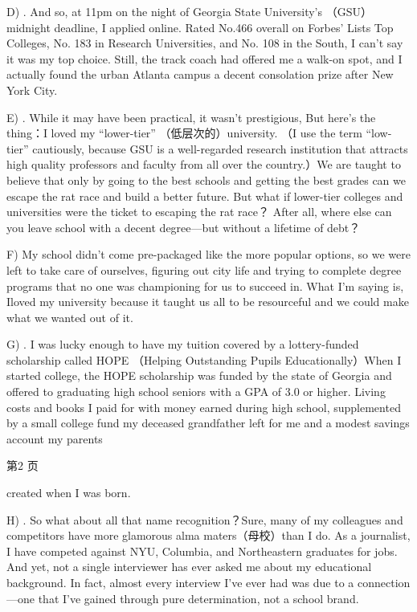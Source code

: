 \documentclass[UTF8,11pt]{ctexart}
\begin{document}
D) . And so, at 11pm on the night of Georgia State University’s （GSU）midnight deadline, I applied online. Rated No.466 overall on Forbes’ Lists Top Colleges, No. 183 in Research Universities, and No. 108 in the South, I can’t say it was my top choice. Still, the track coach had offered me a walk-on spot, and I actually found the urban Atlanta campus a decent consolation prize after New York City.


E) . While it may have been practical, it wasn’t prestigious, But here’s the thing：I loved my “lower-tier” （低层次的）university. （I use the term “low-tier” cautiously, because GSU is a well-regarded research institution that attracts high quality professors and faculty from all over the country.）We are taught to believe that only by going to the best schools and getting the best grades can we escape the rat race and build a better future. But what if lower-tier colleges and universities were the ticket to escaping the rat race？ After all, where else can you leave school with a decent degree—but without a lifetime of debt？


F) My school didn’t come pre-packaged like the more popular options, so we were left to take care of ourselves, figuring out city life and trying to complete degree programs that no one was championing for us to succeed in. What I’m saying is, Iloved my university because it taught us all to be resourceful and we could make what we wanted out of it.


G) . I was lucky enough to have my tuition covered by a lottery-funded scholarship called HOPE （Helping Outstanding Pupils Educationally）When I started college, the HOPE scholarship was funded by the state of Georgia and offered to graduating high school seniors with a GPA of 3.0 or higher. Living costs and books I paid for with money earned during high school, supplemented by a small college fund my deceased grandfather left for me and a modest savings account my parents


第2 页


created when I was born.


H) . So what about all that name recognition？Sure, many of my colleagues and competitors have more glamorous alma maters（母校）than I do. As a journalist, I have competed against NYU, Columbia, and Northeastern graduates for jobs. And yet, not a single interviewer has ever asked me about my educational background. In fact, almost every interview I’ve ever had was due to a connection—one that I’ve gained through pure determination, not a school brand.
\end{document}
